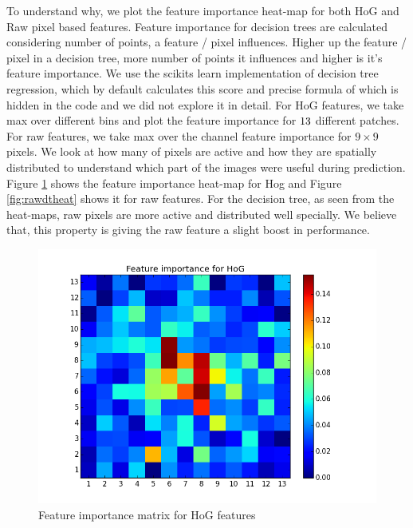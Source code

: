 \documentclass[10pt]{article}
\begin{document}
To understand why, we plot the feature importance heat-map for both HoG and Raw pixel based features. Feature importance for decision trees are calculated considering number of points, a feature / pixel influences. Higher up the feature / pixel in a decision tree, more number of points it influences and higher is it's feature importance. We use the scikits learn implementation of decision tree regression, which by default calculates this score and precise formula of which is hidden in the code and we did not explore it in detail. For HoG features, we take max over different bins and plot the feature importance for $13 \time 13$ different patches. For raw features, we take max over the channel feature importance for $9 \times 9$ pixels. We look at how many of pixels are active and how they are spatially distributed to understand which part of the images were useful during prediction. Figure \ref{fig:hogdtheat} shows the feature importance heat-map for Hog and Figure \ref{fig:rawdtheat} shows it for raw features. For the decision tree, as seen from the heat-maps, raw pixels are more active and distributed well specially. We believe that, this property is giving the raw feature a slight boost in performance.

\begin{figure}
\begin{center}
\includegraphics[scale=0.4]{images/HoG_DT_Heatmap.png}
\caption{Feature importance matrix for HoG features}
\label{fig:hogdtheat}
\end{center}
\end{figure}
\end{document}
